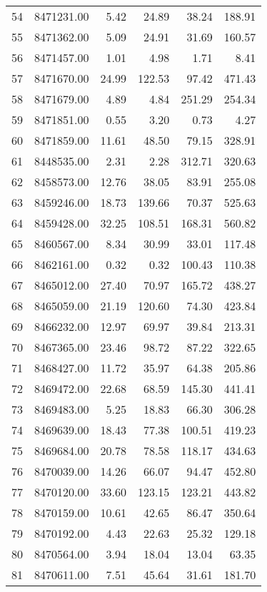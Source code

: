\begin{table}[ht]
\begin{tabular}{rrrrrr}
  54 & 8471231.00 & 5.42 & 24.89 & 38.24 & 188.91 \\ 
  55 & 8471362.00 & 5.09 & 24.91 & 31.69 & 160.57 \\ 
  56 & 8471457.00 & 1.01 & 4.98 & 1.71 & 8.41 \\ 
  57 & 8471670.00 & 24.99 & 122.53 & 97.42 & 471.43 \\ 
  58 & 8471679.00 & 4.89 & 4.84 & 251.29 & 254.34 \\ 
  59 & 8471851.00 & 0.55 & 3.20 & 0.73 & 4.27 \\ 
  60 & 8471859.00 & 11.61 & 48.50 & 79.15 & 328.91 \\ 
  61 & 8448535.00 & 2.31 & 2.28 & 312.71 & 320.63 \\ 
  62 & 8458573.00 & 12.76 & 38.05 & 83.91 & 255.08 \\ 
  63 & 8459246.00 & 18.73 & 139.66 & 70.37 & 525.63 \\ 
  64 & 8459428.00 & 32.25 & 108.51 & 168.31 & 560.82 \\ 
  65 & 8460567.00 & 8.34 & 30.99 & 33.01 & 117.48 \\ 
  66 & 8462161.00 & 0.32 & 0.32 & 100.43 & 110.38 \\ 
  67 & 8465012.00 & 27.40 & 70.97 & 165.72 & 438.27 \\ 
  68 & 8465059.00 & 21.19 & 120.60 & 74.30 & 423.84 \\ 
  69 & 8466232.00 & 12.97 & 69.97 & 39.84 & 213.31 \\ 
  70 & 8467365.00 & 23.46 & 98.72 & 87.22 & 322.65 \\ 
  71 & 8468427.00 & 11.72 & 35.97 & 64.38 & 205.86 \\ 
  72 & 8469472.00 & 22.68 & 68.59 & 145.30 & 441.41 \\ 
  73 & 8469483.00 & 5.25 & 18.83 & 66.30 & 306.28 \\ 
  74 & 8469639.00 & 18.43 & 77.38 & 100.51 & 419.23 \\ 
  75 & 8469684.00 & 20.78 & 78.58 & 118.17 & 434.63 \\ 
  76 & 8470039.00 & 14.26 & 66.07 & 94.47 & 452.80 \\ 
  77 & 8470120.00 & 33.60 & 123.15 & 123.21 & 443.82 \\ 
  78 & 8470159.00 & 10.61 & 42.65 & 86.47 & 350.64 \\ 
  79 & 8470192.00 & 4.43 & 22.63 & 25.32 & 129.18 \\ 
  80 & 8470564.00 & 3.94 & 18.04 & 13.04 & 63.35 \\ 
  81 & 8470611.00 & 7.51 & 45.64 & 31.61 & 181.70 \\ 

\end{tabular}
\end{table}
